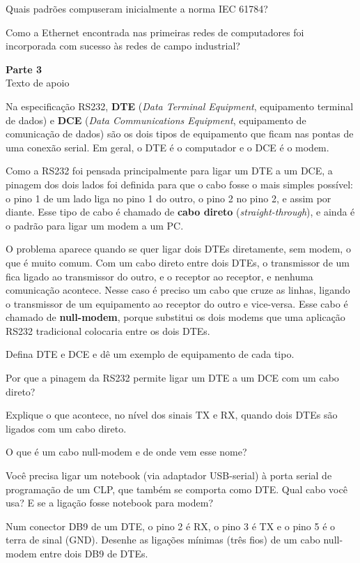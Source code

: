 \documentclass[11pt,a4paper]{article}
\newcommand{\parte}[3]{%
  \par\needspace{9\baselineskip}\vspace{1.2em}%
  \begin{tcolorbox}[enhanced, colback=Navy, colframe=Navy, arc=2pt,
    left=10pt, right=10pt, top=8pt, bottom=8pt, boxrule=0pt]
    {\color{AccentBright}\bfseries\Large Parte #1}\hspace{0.8em}{\color{white}\bfseries\Large #2}\\[2pt]
    {\color{white!75!Navy}\small #3}
  \end{tcolorbox}\vspace{0.3em}}
\newcommand{\q}[1]{\par\vspace{0.9em}\noindent{\color{Accent}\bfseries #1}\hspace{0.7em}}
\begin{document}
Quais padrões compuseram inicialmente a norma IEC 61784?

\q{2.3} Como a Ethernet encontrada nas primeiras redes de computadores foi incorporada com sucesso às redes de campo industrial?

\parte{3}{RS232: DTE versus DCE}{Texto de apoio}

\begin{apoio}
Na especificação RS232, \textbf{DTE} (\emph{Data Terminal Equipment}, equipamento terminal de dados) e \textbf{DCE} (\emph{Data Communications Equipment}, equipamento de comunicação de dados) são os dois tipos de equipamento que ficam nas pontas de uma conexão serial. Em geral, o DTE é o computador e o DCE é o modem.

Como a RS232 foi pensada principalmente para ligar um DTE a um DCE, a pinagem dos dois lados foi definida para que o cabo fosse o mais simples possível: o pino 1 de um lado liga no pino 1 do outro, o pino 2 no pino 2, e assim por diante. Esse tipo de cabo é chamado de \textbf{cabo direto} (\emph{straight-through}), e ainda é o padrão para ligar um modem a um PC.

O problema aparece quando se quer ligar dois DTEs diretamente, sem modem, o que é muito comum. Com um cabo direto entre dois DTEs, o transmissor de um fica ligado ao transmissor do outro, e o receptor ao receptor, e nenhuma comunicação acontece. Nesse caso é preciso um cabo que cruze as linhas, ligando o transmissor de um equipamento ao receptor do outro e vice-versa. Esse cabo é chamado de \textbf{null-modem}, porque substitui os dois modems que uma aplicação RS232 tradicional colocaria entre os dois DTEs.
\end{apoio}

\q{3.1} Defina DTE e DCE e dê um exemplo de equipamento de cada tipo.

\q{3.2} Por que a pinagem da RS232 permite ligar um DTE a um DCE com um cabo direto?

\q{3.3} Explique o que acontece, no nível dos sinais TX e RX, quando dois DTEs são ligados com um cabo direto.

\q{3.4} O que é um cabo null-modem e de onde vem esse nome?

\q{3.5} Você precisa ligar um notebook (via adaptador USB-serial) à porta serial de programação de um CLP, que também se comporta como DTE. Qual cabo você usa? E se a ligação fosse notebook para modem?

\q{3.6} Num conector DB9 de um DTE, o pino 2 é RX, o pino 3 é TX e o pino 5 é o terra de sinal (GND). Desenhe as ligações mínimas (três fios) de um cabo null-modem entre dois DB9 de DTEs.
\end{document}
